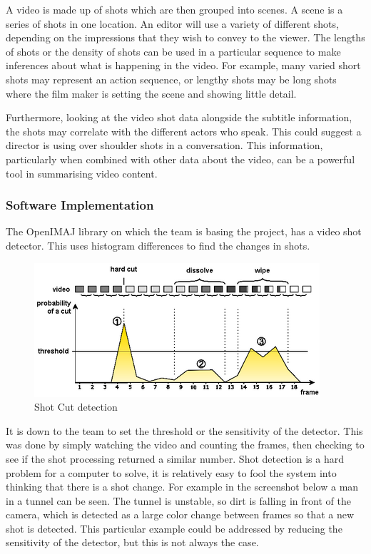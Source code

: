 A video is made up of shots which are then grouped into scenes. A scene is a series of
shots in one location. An editor will use a variety of different shots, depending on the impressions that they wish to convey to the viewer. The lengths of shots or the density of shots can be used in a particular sequence to make inferences about what is happening in the video. For example, many varied short shots may represent an action sequence, or lengthy shots may be long shots where the film maker is setting the scene and showing little detail. 

Furthermore, looking at the video shot data alongside the subtitle information, the shots may correlate with the different actors who speak. 
This could suggest a director is using over shoulder shots in a conversation. This information, particularly when combined with other data about the video, can be a powerful tool in summarising video content.

\subsubsection{Software Implementation}
The OpenIMAJ library on which the team is basing the project, has a video shot detector. This
uses histogram differences to find the changes in shots.

\begin{figure}[h1]
\begin{center}
 \includegraphics[trim = 0mm 0mm 0mm 0mm, clip,
 scale=1.4]{Images/Cut_Detection_Diagram.png}
  \caption{Shot Cut detection}\label{fig:cutDetectionDiagram}
 \end{center}
\end{figure}

It is down to the team to set the threshold or the sensitivity of the detector. This was done by
simply watching the video and counting the frames, then checking to see if the shot processing
returned a similar number. Shot detection is a hard problem for a computer to solve,
it is relatively easy to fool the system into thinking that there is a shot change. For example in the screenshot below a man in a tunnel can be seen. 
The tunnel is unstable, so dirt is falling in front of the camera, which is detected as a large color change between frames so that a new shot is detected. This particular example could be addressed by reducing the sensitivity of the detector, but this is not always the case.

